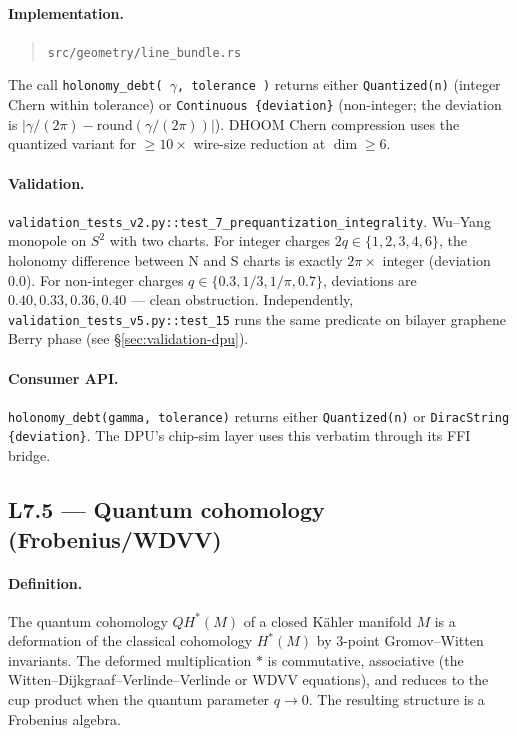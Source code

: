 \documentclass[11pt,letterpaper]{article}
\begin{document}
\paragraph{Implementation.}
\begin{quote}
\sloppy
\texttt{src/geometry/line\_bundle.rs}
\end{quote}
The call \texttt{holonomy\_debt(\,$\gamma$, tolerance\,)} returns
either \texttt{Quantized(n)} (integer Chern within tolerance) or
\texttt{Continuous \{deviation\}} (non-integer; the deviation is
$|\gamma/(2\pi) - \mathrm{round}(\gamma/(2\pi))|$). DHOOM Chern
compression uses the quantized variant for $\geq 10\times$
wire-size reduction at $\dim \geq 6$.

\paragraph{Validation.}
\texttt{validation\_tests\_v2.py::test\_7\_prequantization\_integrality}.
Wu--Yang monopole on $S^2$ with two charts. For integer charges
$2q \in \{1, 2, 3, 4, 6\}$, the holonomy difference between N and S
charts is exactly $2\pi \times$ integer (deviation $0.0$). For
non-integer charges $q \in \{0.3, 1/3, 1/\pi, 0.7\}$, deviations
are $0.40, 0.33, 0.36, 0.40$ --- clean obstruction.
Independently, \texttt{validation\_tests\_v5.py::test\_15} runs the
same predicate on bilayer graphene Berry phase (see
\S\ref{sec:validation-dpu}).

\paragraph{Consumer API.}
\texttt{holonomy\_debt(gamma, tolerance)} returns either
\texttt{Quantized(n)} or \texttt{DiracString \{deviation\}}.
The DPU's chip-sim layer uses this verbatim through its FFI bridge.


\subsection{L7.5 --- Quantum cohomology (Frobenius/WDVV)}

\paragraph{Definition.}
The quantum cohomology $QH^*(M)$ of a closed K\"ahler manifold $M$
is a deformation of the classical cohomology $H^*(M)$ by 3-point
Gromov--Witten invariants. The deformed multiplication $*$ is
commutative, associative (the Witten--Dijkgraaf--Verlinde--Verlinde
or WDVV equations), and reduces to the cup product when the
quantum parameter $q \to 0$. The resulting structure is a Frobenius
algebra.
\end{document}
